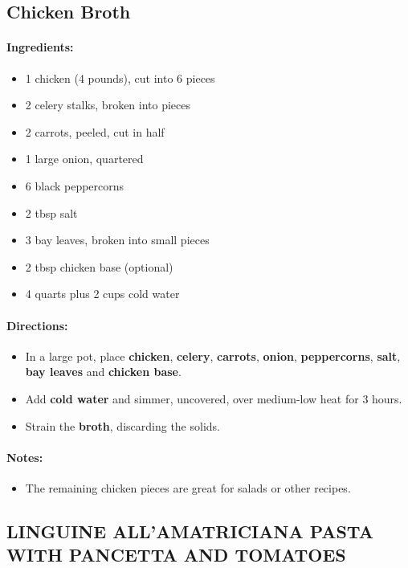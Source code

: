 \documentclass{article}
\begin{document}
\subsection{Chicken Broth}

\paragraph{Ingredients:}
\begin{itemize}
    \item 1 chicken (4 pounds), cut into 6 pieces
    \item 2 celery stalks, broken into pieces
    \item 2 carrots, peeled, cut in half
    \item 1 large onion, quartered
    \item 6 black peppercorns
    \item 2 tbsp salt
    \item 3 bay leaves, broken into small pieces
    \item 2 tbsp chicken base (optional)
    \item 4 quarts plus 2 cups cold water
\end{itemize}

\paragraph{Directions:}
\begin{itemize}
    \item In a large pot, place \textbf{chicken}, \textbf{celery}, \textbf{carrots}, \textbf{onion}, \textbf{peppercorns}, \textbf{salt}, \textbf{bay leaves} and \textbf{chicken base}.
    \item Add \textbf{cold water} and simmer, uncovered, over medium-low heat for 3 hours.
    \item Strain the \textbf{broth}, discarding the solids.
\end{itemize}

\paragraph{Notes:}
\begin{itemize}
    \item The remaining chicken pieces are great for salads or other recipes.
\end{itemize}

\subsection{LINGUINE ALL'AMATRICIANA PASTA WITH PANCETTA AND TOMATOES}
\end{document}
